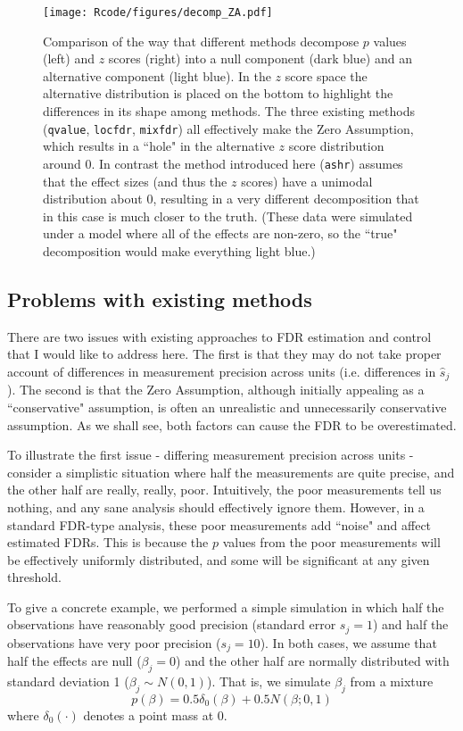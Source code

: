 \documentclass[11pt]{article}
\def\shat{\hat{s}}
\def\qvalue{{\tt qvalue}\xspace}
\def\locfdr{{\tt locfdr}\xspace}
\def\mixfdr{{\tt mixfdr}\xspace}
\def\ashr{{\tt ashr}\xspace}
\begin{document}
\begin{figure}
\center \texttt{[image: Rcode/figures/decomp\_ZA.pdf]}
\caption{Comparison of the way that different methods decompose $p$ values (left) and $z$ scores (right) into a null component (dark blue) and an alternative component (light blue). In the $z$ score space the alternative distribution is placed on the bottom to highlight the differences in its shape among methods.
The three existing methods (\qvalue, \locfdr, \mixfdr) all effectively make the Zero Assumption, which results in a ``hole" in the alternative $z$ score distribution around 0.
In contrast the method introduced here (\ashr) assumes that the effect sizes (and thus the $z$ scores) have a unimodal distribution about 0, resulting in a very different decomposition that in this case is much closer to the truth. (These data were simulated under a model where all of the effects are non-zero, so the ``true" decomposition would make everything light blue.)} \label{fig:ZA}
\end{figure}




\subsection*{Problems with existing methods}

 There are two issues with existing approaches to FDR estimation and control that I would like to address here. 
 The first is that they may do not take proper account of differences in measurement precision across units (i.e. differences in $\shat_j$). 
 The second is that the Zero Assumption, although initially appealing as a ``conservative" assumption,
  is often an unrealistic and unnecessarily conservative assumption. As we shall see, both factors can cause the FDR to be overestimated.
 
 To illustrate the first issue - differing measurement precision across units - consider a simplistic
 situation where half the measurements are quite precise, and the other half are really, really, poor. 
 Intuitively, the poor measurements tell us nothing, and any sane analysis should effectively ignore them. However, in a standard FDR-type analysis, these poor measurements add ``noise" and affect estimated FDRs. This is because the $p$ values from the poor measurements will be effectively uniformly distributed, and some will be significant at any given threshold. 
 
To give a concrete example, we performed a simple simulation in which half the observations have
reasonably good precision (standard error $s_j = 1$) and half the observations have very poor precision ($s_j=10$). In both cases,
we assume that half the effects are null ($\beta_j=0$)
and the other half are normally distributed with standard deviation 1 ($\beta_j \sim N(0,1)$). 
That is, we simulate $\beta_j$ from a mixture 
\begin{equation}
p(\beta) = 0.5 \delta_0(\beta) + 0.5 N(\beta; 0,1)
\end{equation}
where $\delta_0(\cdot)$ denotes a point mass at 0.
\end{document}

